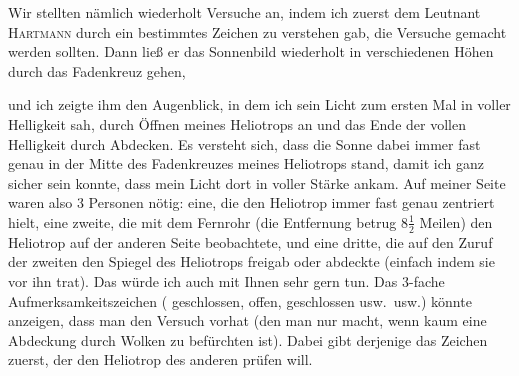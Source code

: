 Wir stellten nämlich wiederholt Versuche an, indem ich zuerst dem Leutnant \textsc{Hartmann} durch ein bestimmtes Zeichen zu verstehen gab,  die Versuche gemacht werden sollten.
Dann ließ er das Sonnenbild wiederholt in verschiedenen Höhen durch das Fadenkreuz gehen,
\par\vspace{.7cm}
{\centering
{}\par}
\vspace{.7cm}\noindent und ich zeigte ihm den Augenblick, in dem ich sein Licht zum ersten Mal in voller Helligkeit sah, durch Öffnen meines Heliotrops an und das Ende der vollen Helligkeit durch Abdecken.
Es versteht sich, dass die Sonne dabei immer fast genau in der Mitte des Fadenkreuzes meines Heliotrops stand, damit ich ganz sicher sein konnte, dass mein Licht dort in voller Stärke ankam.
Auf meiner Seite waren also 3 Personen nötig: eine, die den Heliotrop immer fast genau zentriert hielt, eine zweite, die mit dem Fernrohr (die Entfernung betrug \(8\frac{1}{2}\) Meilen) den Heliotrop auf der anderen Seite beobachtete, und eine dritte, die auf den Zuruf der zweiten den Spiegel des Heliotrops freigab oder abdeckte (einfach indem sie vor ihn trat).
Das würde ich auch mit Ihnen sehr gern tun.
Das 3-fache Aufmerksamkeitszeichen ( geschlossen,  offen,  geschlossen usw.\ usw.) könnte anzeigen, dass man den Versuch vorhat (den man nur macht, wenn kaum eine Abdeckung durch Wolken zu befürchten ist). Dabei gibt derjenige das Zeichen zuerst, der den Heliotrop des anderen prüfen will.
